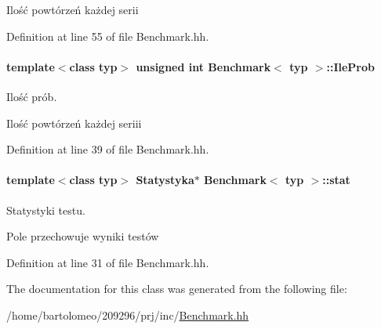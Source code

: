 Ilość powtórzeń każdej serii 

Definition at line 55 of file Benchmark.\-hh.

\hypertarget{class_benchmark_ab53d909a3f18b43037cc18f700858d8e}{
\paragraph[{Ile\-Prob}]{\setlength{\rightskip}{0pt plus 5cm}template$<$class typ$>$ unsigned int {\bf Benchmark}$<$ typ $>$\-::Ile\-Prob\hspace{0.3cm}{\ttfamily [private]}}}\label{class_benchmark_ab53d909a3f18b43037cc18f700858d8e}


Ilość prób. 

Ilość powtórzeń każdej seriii 

Definition at line 39 of file Benchmark.\-hh.

\hypertarget{class_benchmark_aa808f4e600325e1ed21fcc5766ce5a8b}{
\paragraph[{stat}]{\setlength{\rightskip}{0pt plus 5cm}template$<$class typ$>$ {\bf Statystyka}$\ast$ {\bf Benchmark}$<$ typ $>$\-::stat\hspace{0.3cm}{\ttfamily [private]}}}\label{class_benchmark_aa808f4e600325e1ed21fcc5766ce5a8b}


Statystyki testu. 

Pole przechowuje wyniki testów 

Definition at line 31 of file Benchmark.\-hh.



The documentation for this class was generated from the following file\-:\begin{DoxyCompactItemize}
\item 
/home/bartolomeo/209296/prj/inc/\hyperlink{_benchmark_8hh}{Benchmark.\-hh}\end{DoxyCompactItemize}
